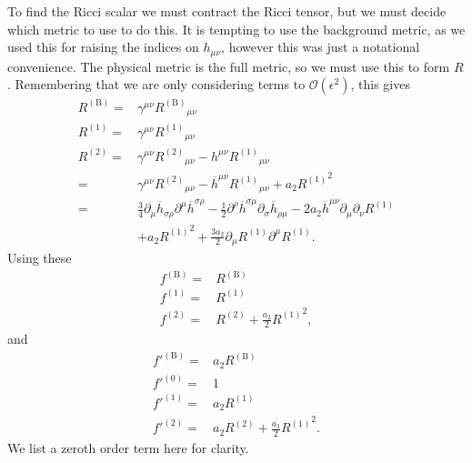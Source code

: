 \documentclass[a4paper, 11pt, titlepage, twoside]{report}
\newcommand{\recip}[1]{\ensuremath{\frac{1}{#1}}}
\newcommand{\order}[1]{\ensuremath{\mathcal{O}({#1})}}
\begin{document}
To find the Ricci scalar we must contract the Ricci tensor, but we must decide which metric to use to do this. It is tempting to use the background metric, as we used this for raising the indices on $h_{\mu\nu}$, however this was just a notational convenience. The physical metric is the full metric, so we must use this to form $R$. Remembering that we are only considering terms to $\order{\epsilon^2}$, this gives
\begin{align}
R^{(\mathrm{B})} = {} & \gamma^{\mu\nu} {R^{(\mathrm{B})}}_{\mu\nu} \\
R^{(1)} = {} & \gamma^{\mu\nu} {R^{(1)}}_{\mu\nu} \\
R^{(2)} = {} & \gamma^{\mu\nu} {R^{(2)}}_{\mu\nu} - h^{\mu\nu} {R^{(1)}}_{\mu\nu} \nonumber \\
 = {} & \gamma^{\mu\nu} {R^{(2)}}_{\mu\nu} - \overline{h}^{\mu\nu} {R^{(1)}}_{\mu\nu} + a_2 {R^{(1)}}^2 \nonumber \\
 = {} & \frac{3}{4}\partial_\mu\overline{h}_{\sigma\rho}\partial^\mu\overline{h}^{\sigma\rho} - \recip{2} \partial^\rho\overline{h}^{\sigma\mu}\partial_\sigma\overline{h}_{\rho\mu} - 2a_2 \overline{h}^{\mu\nu}\partial_\mu\partial_\nu R^{(1)} \nonumber \\
 & + {} a_2 {R^{(1)}}^2 + \frac{3a_2}{2}\partial_\mu R^{(1)} \partial^\mu R^{(1)}.
\end{align}
Using these
\begin{align}
f^{(\mathrm{B})} = {} & R^{(\mathrm{B})} \\
f^{(1)} = {} & R^{(1)} \\
f^{(2)} = {} & R^{(2)} + \frac{a_2}{2}{R^{(1)}}^2,
\end{align}
and
\begin{align}
f'^{(\mathrm{B})} = {} & a_2 R^{(\mathrm{B})} \\
f'^{(0)} = {} & 1 \\
f'^{(1)} = {} & a_2 R^{(1)} \\
f'^{(2)} = {} & a_2 R^{(2)} + \frac{a_3}{2}{R^{(1)}}^2.
\end{align}
We list a zeroth order term here for clarity.
\end{document}
